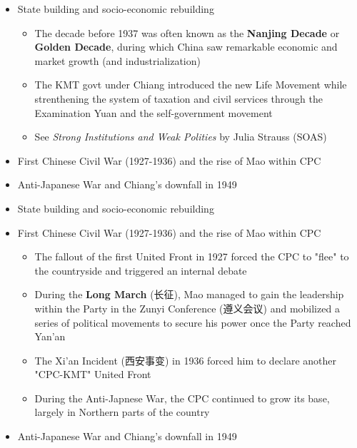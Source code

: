 \documentclass[
  10pt,
  ignorenonframetext,
]{beamer}
\begin{document}
\begin{frame}
\begin{itemize}
  \item State building and socio-economic rebuilding
  \vspace{0.1cm}
  \begin{itemize}
    \item The decade before 1937 was often known as the \textbf{Nanjing Decade} or \textbf{Golden Decade}, during which China saw remarkable economic and market growth (and industrialization)
    \item The KMT govt under Chiang introduced the new Life Movement while strenthening the system of taxation and civil services through the Examination Yuan and the self-government movement
    \item See \textit{Strong Institutions and Weak Polities} by Julia Strauss (SOAS)
  \end{itemize}
  \vspace{0.6cm}
  \item First Chinese Civil War (1927-1936) and the rise of Mao within CPC
  \vspace{0.6cm}
  \item Anti-Japanese War and Chiang's downfall in 1949
\end{itemize}
\end{frame}

\begin{frame}
\begin{itemize}
  \item State building and socio-economic rebuilding
  \vspace{0.6cm}
  \item First Chinese Civil War (1927-1936) and the rise of Mao within CPC
  \vspace{0.1cm}
  \begin{itemize}
    \item The fallout of the first United Front in 1927 forced the CPC to "flee" to the countryside and triggered an internal debate
    \item During the \textbf{Long March} (长征), Mao managed to gain the leadership within the Party in the Zunyi Conference (遵义会议) and mobilized a series of political movements to secure his power once the Party reached Yan'an
    \item The Xi'an Incident (西安事变) in 1936 forced him to declare another "CPC-KMT" United Front
    \item During the Anti-Japnese War, the CPC continued to grow its base, largely in Northern parts of the country 
  \end{itemize}
  \vspace{0.6cm}
  \item Anti-Japanese War and Chiang's downfall in 1949
\end{itemize}
\end{frame}
\end{document}
